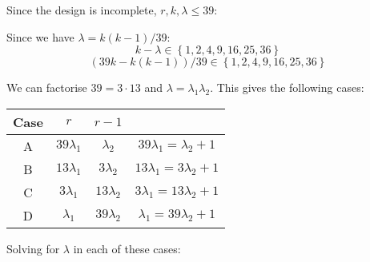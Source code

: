\documentclass[a4paper, 11pt]{article}
\def\set#1{\left\{ #1 \right\}}
\begin{document}
Since the design is incomplete, $r,k,\lambda\leq39$: 

Since we have $\lambda = k(k-1)/39$:
$$k-\lambda\in\set{1,2,4,9,16,25,36}$$
$$(39k- k(k-1))/39\in\set{1,2,4,9,16,25,36}$$




We can factorise $39=3\cdot 13$ and $\lambda=\lambda_1\lambda_2$. This gives the following cases: 

\begin{center}
	\begin{tabular}{c|cc|c}
		Case& $r$           & $r-1$         &                              \\\midrule
		A	& $39\lambda_1$ & $\lambda_2  $ & $39\lambda_1=\lambda_2  +1$  \\
		B	& $13\lambda_1$ & $3\lambda_2 $ & $13\lambda_1=3\lambda_2 +1$  \\
		C	& $3\lambda_1 $ & $13\lambda_2$ & $3\lambda_1 =13\lambda_2+1$  \\
		D	& $\lambda_1  $ & $39\lambda_2$ & $\lambda_1  =39\lambda_2+1$  \\
		\end{tabular}
\end{center}

Solving for $\lambda$ in each of these cases:
\end{document}
